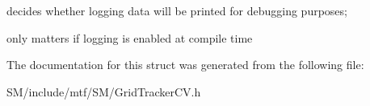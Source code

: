 decides whether logging data will be printed for debugging purposes; 

only matters if logging is enabled at compile time 

The documentation for this struct was generated from the following file\-:\begin{DoxyCompactItemize}
\item 
S\-M/include/mtf/\-S\-M/Grid\-Tracker\-C\-V.\-h\end{DoxyCompactItemize}
